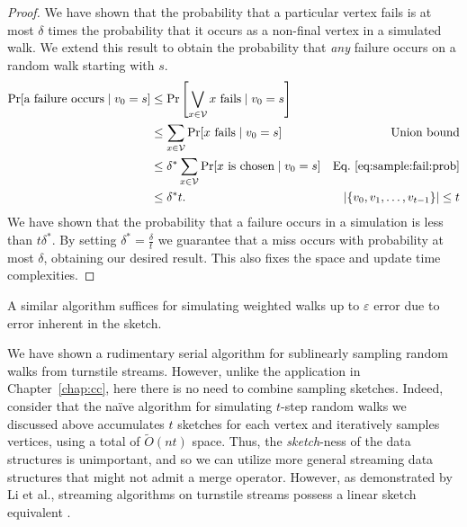 \documentclass{report}
\newcommand{\E}{\mathbb{E}}
\begin{document}
\begin{proof}
We have shown that the probability that a particular vertex fails is at most $\delta$ times the probability that it occurs as a non-final vertex in a simulated walk.
We extend this result to obtain the probability that \emph{any} failure occurs on a random walk starting with $s$.
%
\begin{align*}
\Pr [\textnormal{a failure occurs} \mid v_0 = s]
&\leq 
\Pr \left [ \bigvee_{x \in \mathcal{V}} \textnormal{$x$ fails} \mid v_0 = s \right ]
&\\
&\leq
\sum_{x \in \mathcal{V}} \Pr [\textnormal{$x$ fails} \mid v_0 = s ] 
& \textnormal{Union bound}\\
&\leq
\delta^* \sum_{x \in \mathcal{V}} \Pr [\textnormal{$x$ is chosen} \mid v_0 = s ] 
& \textnormal{Eq.~\ref{eq:sample:fail:prob}}\\
&\leq
\delta^* t.
& |\{v_0, v_1, \dots, v_{t-1} \}| \leq t
\end{align*}
We have shown that the probability that a failure occurs in a simulation is less than $t\delta^*$.
By setting $\delta^* = \frac{\delta}{t}$ we guarantee that a miss occurs with probability at most $\delta$, obtaining our desired result.
This also fixes the space and update time complexities.
\end{proof}

A similar algorithm suffices for simulating weighted walks up to $\varepsilon$ error due to error inherent in the sketch.


We have shown a rudimentary serial algorithm for sublinearly sampling random walks from turnstile streams.
However, unlike the application in Chapter~\ref{chap:cc}, here there is no need to combine sampling sketches. 
Indeed, consider that the na\"ive algorithm for simulating $t$-step random walks we discussed above accumulates $t$ sketches for each vertex and iteratively samples vertices, using a total of $\widetilde{O}(nt)$ space.
Thus, the \emph{sketch}-ness of the data structures is unimportant, and so we can utilize more general streaming data structures that might not admit a merge operator.
However, as demonstrated by Li et al., streaming algorithms on turnstile streams possess a linear sketch equivalent \cite{li2014turnstile}. 
\end{document}
